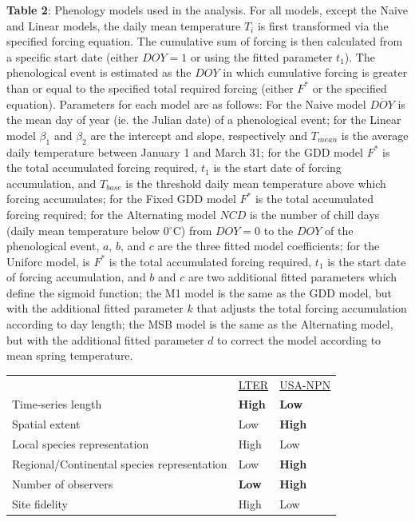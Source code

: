 \documentclass[fleqn,12pt,lineno]{article}
\begin{document}
\textbf{Table 2}: Phenology models used in the analysis. For all models, except the Naive and Linear models, the daily mean temperature $T_{i}$ is first transformed via the specified forcing equation. The cumulative sum of forcing is then calculated from a specific start date (either $DOY=1$ or using the fitted parameter $t_{1}$). The phenological event is estimated as the $DOY$ in which cumulative forcing is greater than or equal to the specified total required forcing (either $F^{*}$ or the specified equation). Parameters for each model are as follows: For the Naive model $\overline{DOY}$ is the mean day of year (ie. the Julian date) of a phenological event; for the Linear model $\beta_{1}$ and $\beta_{2}$ are the intercept and slope, respectively and $T_{mean}$ is the average daily temperature between January 1 and March 31; for the GDD model $F^{*}$ is the total accumulated forcing required, $t_{1}$ is the start date of forcing accumulation, and $T_{base}$ is the threshold daily mean temperature above which forcing accumulates; for the Fixed GDD model $F^{*}$ is the total accumulated forcing required; for the Alternating model $NCD$ is the number of chill days (daily mean temperature below 0$^{\circ}$C) from $DOY=0$ to the $DOY$ of the phenological event, $a$, $b$, and $c$ are the three fitted model coefficients; for the Uniforc model, is $F^{*}$ is the total accumulated forcing required, $t_{1}$ is the start date of forcing accumulation, and $b$ and $c$ are two additional fitted parameters which define the sigmoid function; the M1 model is the same as the GDD model, but with the additional fitted parameter $k$ that adjusts the total forcing accumulation according to day length; the MSB model is the same as the Alternating model, but with the additional fitted parameter $d$ to correct the model according to mean spring temperature. 


\newpage


\begin{tabular}{lll}
                                & \underline{LTER}  & \underline{USA-NPN}           \\
Time-series length                          & \textbf{High} & \textbf{Low}  \\
Spatial extent                              & Low           & \textbf{High} \\
Local species representation                & High          & Low           \\
Regional/Continental species representation & Low           & \textbf{High} \\
Number of observers                         & \textbf{Low}  & \textbf{High} \\
Site fidelity                               & High          & Low          
\end{tabular}
\end{document}

